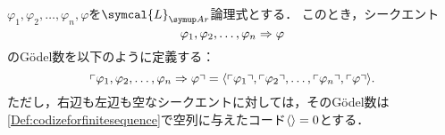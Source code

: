 \begin{Def}[シークエントのGödel数] \label{Def:sequentGodelNumber}
	\(\varphi_1, \varphi_2, \dots, \varphi_n, \varphi\)を\(\symcal{L}_{\Ar}\)論理式とする．
	このとき，シークエント
	\[
		\varphi_1, \varphi_2, \dots, \varphi_n \Rightarrow \varphi
	\]
	のGödel数を以下のように定義する：
	\begin{equation}
		\mathopen{}\left\ulcorner \varphi_1, \varphi_2, \dots, \varphi_n \Rightarrow \varphi \right\urcorner\mathclose{} =
		\langle 
			\mathopen{}\left\ulcorner \varphi_1 \right\urcorner\mathclose{},
			\mathopen{}\left\ulcorner \varphi_2 \right\urcorner\mathclose{},
			\dots,
			\mathopen{}\left\ulcorner \varphi_n \right\urcorner\mathclose{},
			\mathopen{}\left\ulcorner \varphi \right\urcorner\mathclose{}
		 \rangle.
		\label{eq:sequentGodelNumber}
	\end{equation}
	ただし，右辺も左辺も空なシークエントに対しては，そのGödel数は\cref{Def:codizeforfinitesequence}で空列に与えたコード\(\langle  \rangle = 0\)とする．
\end{Def}

